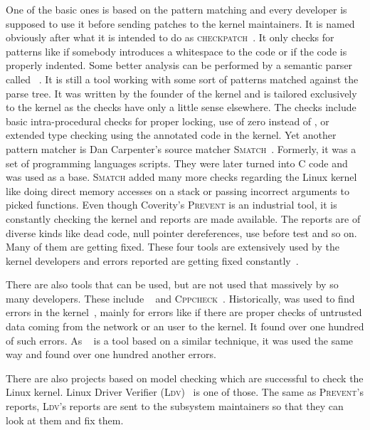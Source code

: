 One of the basic ones is based on the pattern matching and every developer
is supposed to use it before sending patches to the kernel maintainers. It is
named obviously after what it is intended to do as
\textsc{checkpatch}~\cite{checkpatch}. It only checks for patterns like if
somebody introduces a whitespace to the code or if the code is properly
indented. Some better analysis can be performed by a semantic parser called
\sparse~\cite{sparse}. It is still a tool working with some sort of patterns
matched against the parse tree.  It was written by the founder of the kernel
and is tailored exclusively to the kernel as the checks have only a little
sense elsewhere.  The checks include basic intra-procedural checks for proper
locking, use of zero instead of , or extended type checking using
the annotated code in the kernel. Yet another pattern matcher is Dan
Carpenter's source matcher \textsc{Smatch}~\cite{smatch}. Formerly, it was a
set of \perl programming languages scripts. They were later turned into C code
and \sparse was used as a base. \textsc{Smatch} added many more checks
regarding the Linux kernel like doing direct memory accesses on a stack or
passing incorrect arguments to picked functions. Even though Coverity's
\textsc{Prevent} is an industrial tool, it is constantly checking the kernel
and reports are made available. The reports are of diverse kinds like dead
code, null pointer dereferences, use before test and so on. Many of them are
getting fixed. These four tools are extensively used by the kernel developers
and errors reported are getting fixed constantly~\cite{linux_faults}.

There are also tools that can be used, but are not used that massively by so
many developers. These include \clang~\cite{clang} and
\textsc{Cppcheck}~\cite{cppcheck}.  Historically, \xgcc was used to find
errors in the kernel~\cite{metal_kernel}, mainly for errors like if there are
proper checks of untrusted data coming from the network or an user to the
kernel. It found over one hundred of such errors. As \stan~\cite{stanse} is a
tool based on a similar technique, it was used the same way and found over one
hundred another errors.

There are also projects based on model checking which are successful to check
the Linux kernel. Linux Driver Verifier (\textsc{Ldv})~\cite{ldv} is one of
those. The same as \textsc{Prevent}'s reports, \textsc{Ldv}'s reports are sent
to the subsystem maintainers so that they can look at them and fix them.


